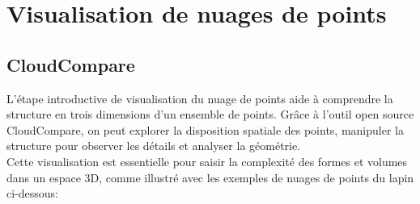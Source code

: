 \documentclass[../5RO17_TP4.tex]{subfiles}
\begin{document}
\section{Visualisation de nuages de points}

\subsection{CloudCompare}
\noindent L'étape introductive de visualisation du nuage de points aide à comprendre la structure en trois dimensions d'un ensemble de points. Grâce à l'outil open source CloudCompare, on peut explorer la disposition spatiale des points, manipuler la structure pour observer les détails et analyser la géométrie.\\

\noindent Cette visualisation est essentielle pour saisir la complexité des formes et volumes dans un espace 3D, comme illustré avec les exemples de nuages de points du lapin ci-dessous:
\end{document}
